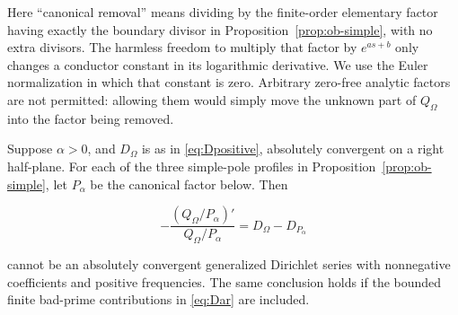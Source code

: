 Here ``canonical removal'' means dividing by the finite-order elementary factor having exactly the boundary divisor in Proposition~\ref{prop:ob-simple}, with no extra divisors. The harmless freedom to multiply that factor by \(e^{as+b}\) only changes a conductor constant in its logarithmic derivative. We use the Euler normalization in which that constant is zero. Arbitrary zero-free analytic factors are not permitted: allowing them would simply move the unknown part of \(Q_\Omega\) into the factor being removed.

\begin{proposition}\label{prop:ob-simple-peeling}

Suppose \(\alpha>0\), and \(D_\Omega\) is as in \eqref{eq:Dpositive}, absolutely convergent on a right half-plane. For each of the three simple-pole profiles in Proposition~\ref{prop:ob-simple}, let \(P_\alpha\) be the canonical factor below. Then

\begin{equation}\label{eq:ob3-1}
-\frac{(Q_\Omega/P_\alpha)'}{Q_\Omega/P_\alpha}
=D_\Omega-D_{P_\alpha}
\end{equation}

cannot be an absolutely convergent generalized Dirichlet series with nonnegative coefficients and positive frequencies. The same conclusion holds if the bounded finite bad-prime contributions in \eqref{eq:Dar} are included.

\end{proposition}

